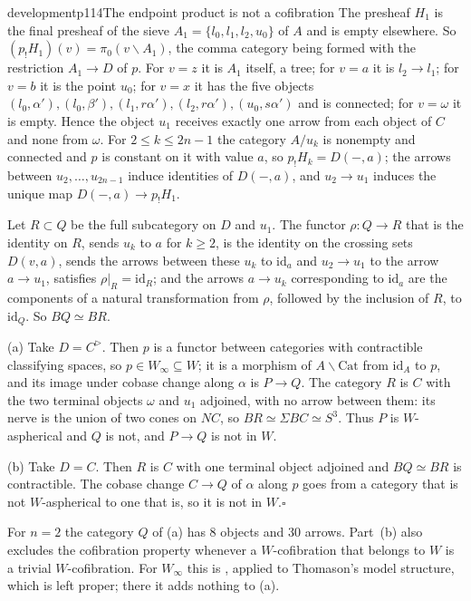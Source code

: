 \begin{dcomment}{development}{p114}{The endpoint product is not a cofibration}
The presheaf $H_1$ is the final presheaf of the sieve $A_1=\{l_0,l_1,l_2,u_0\}$ of $A$ and is empty elsewhere. So $(p_!H_1)(v)=\pi_0(v\backslash A_1)$, the comma category being formed with the restriction $A_1\to D$ of $p$. For $v=z$ it is $A_1$ itself, a tree; for $v=a$ it is $l_2\to l_1$; for $v=b$ it is the point $u_0$; for $v=x$ it has the five objects $(l_0,\alpha'),(l_0,\beta'),(l_1,r\alpha'),(l_2,r\alpha'),(u_0,s\alpha')$ and is connected; for $v=\omega$ it is empty. Hence the object $u_1$ receives exactly one arrow from each object of $C$ and none from $\omega$. For $2\leq k\leq2n-1$ the category $A/u_k$ is nonempty and connected and $p$ is constant on it with value $a$, so $p_!H_k=D(-,a)$; the arrows between $u_2,\dots,u_{2n-1}$ induce identities of $D(-,a)$, and $u_2\to u_1$ induces the unique map $D(-,a)\to p_!H_1$.

Let $R\subset Q$ be the full subcategory on $D$ and $u_1$. The functor $\rho:Q\to R$ that is the identity on $R$, sends $u_k$ to $a$ for $k\geq2$, is the identity on the crossing sets $D(v,a)$, sends the arrows between these $u_k$ to $\mathrm{id}_a$ and $u_2\to u_1$ to the arrow $a\to u_1$, satisfies $\rho|_R=\mathrm{id}_R$; and the arrows $a\to u_k$ corresponding to $\mathrm{id}_a$ are the components of a natural transformation from $\rho$, followed by the inclusion of $R$, to $\mathrm{id}_Q$. So $BQ\simeq BR$.

(a) Take $D=C^{\triangleright}$. Then $p$ is a functor between categories with contractible classifying spaces, so $p\in W_\infty\subseteq W$; it is a morphism of $A\backslash\mathrm{Cat}$ from $\mathrm{id}_A$ to $p$, and its image under cobase change along $\alpha$ is $P\to Q$. The category $R$ is $C$ with the two terminal objects $\omega$ and $u_1$ adjoined, with no arrow between them: its nerve is the union of two cones on $NC$, so $BR\simeq\Sigma BC\simeq S^3$. Thus $P$ is $W$-aspherical and $Q$ is not, and $P\to Q$ is not in $W$.

(b) Take $D=C$. Then $R$ is $C$ with one terminal object adjoined and $BQ\simeq BR$ is contractible. The cobase change $C\to Q$ of $\alpha$ along $p$ goes from a category that is not $W$-aspherical to one that is, so it is not in $W$.\hfill$\square$

For $n=2$ the category $Q$ of (a) has $8$ objects and $30$ arrows. Part~(b) also excludes the cofibration property whenever a $W$-cofibration that belongs to $W$ is a trivial $W$-cofibration. For $W_\infty$ this is \citet[Lemma~1.10]{BataninBerger2017}, applied to Thomason's model structure, which is left proper; there it adds nothing to (a).


\end{dcomment}
